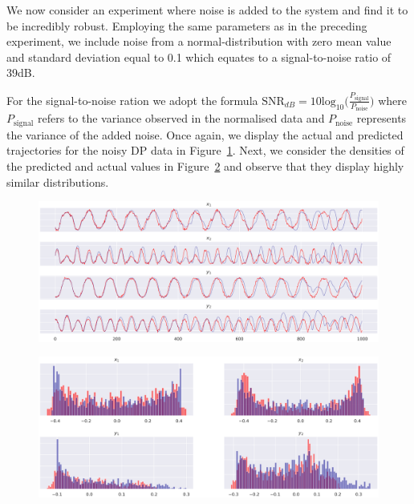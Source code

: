 We now consider an experiment where noise is added to the system and find it to be incredibly robust. Employing the same parameters as in the preceding experiment, we include noise from a normal-distribution with zero mean value and standard deviation equal to 0.1 which equates to a signal-to-noise ratio of 39dB.

For the signal-to-noise ration we adopt the formula $\text{SNR}_{dB}=10\text{log}_{10}\big(\frac{P_\text{{signal}}}{P_{\text{noise}}}\big)$ where $P_\text{{signal}}$ refers to the variance observed in the normalised data and $P_{\text{noise}}$ represents the variance of the added noise.
Once again, we display the actual and predicted trajectories for the noisy DP data in Figure~\ref{fig:noisydp_success_traj}. 
Next, we consider the densities of the predicted and actual values in Figure~\ref{fig:noisydp_success_density} and observe that they display highly similar distributions.

\begin{figure}[ht]
  \centering
  \includegraphics[width=0.95\linewidth]{Graphs/_dp_noise_FigCD_2030.eps} 
 \label{fig:noisydp_success_traj}
\end{figure}
\begin{figure}[ht]
  \centering
  \includegraphics[width=\linewidth]{Graphs/_dp_noise_2B_2030.eps}
  \label{fig:noisydp_success_density}
 \end{figure}

